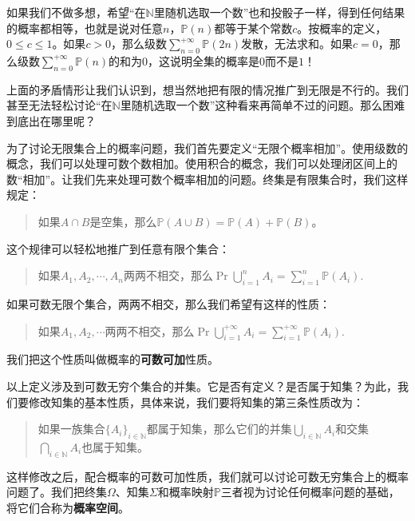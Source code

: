 \documentclass[12pt,UTF8]{ctexbook}
\begin{document}
如果我们不做多想，希望“在$\mathbb{N}$里随机选取一个数”也和投骰子一样，得到任何结果的概率都相等，也就是说对任意$n$，$\mathbb{P}(n)$都等于某个常数$c$。按概率的定义，$0\leqslant c\leqslant 1$。如果$c>0$，那么级数$\sum_{n=0}^{+\infty} \mathbb{P}(2n)$发散，无法求和。如果$c=0$，那么级数$\sum_{n=0}^{+\infty} \mathbb{P}(n)$的和为$0$，这说明全集的概率是$0$而不是$1$！

上面的矛盾情形让我们认识到，想当然地把有限的情况推广到无限是不行的。我们甚至无法轻松讨论“在$\mathbb{N}$里随机选取一个数”这种看来再简单不过的问题。那么困难到底出在哪里呢？

为了讨论无限集合上的概率问题，我们首先要定义“无限个概率相加”。使用级数的概念，我们可以处理可数个数相加。使用积合的概念，我们可以处理闭区间上的数“相加”。让我们先来处理可数个概率相加的问题。终集是有限集合时，我们这样规定：
\begin{quotation}
    如果$A\cap B$是空集，那么$\mathbb{P}(A\cup B) = \mathbb{P}(A) + \mathbb{P}(B)$。
\end{quotation}
这个规律可以轻松地推广到任意有限个集合：
\begin{quotation}
    \noindent 如果$A_1,A_2, \cdots, A_n$两两不相交，那么$\displaystyle\Pr{\bigcup_{i=1}^n A_i} = \sum_{i=1}^n \mathbb{P}(A_i).$
\end{quotation}
如果可数无限个集合，两两不相交，那么我们希望有这样的性质：
\begin{quotation}
    \noindent 如果$A_1,A_2, \cdots$两两不相交，那么$\displaystyle\Pr{\bigcup_{i=1}^{+\infty} A_i} = \sum_{i=1}^{+\infty} \mathbb{P}(A_i).$
\end{quotation}
我们把这个性质叫做概率的\textbf{可数可加}性质。

以上定义涉及到可数无穷个集合的并集。它是否有定义？是否属于知集？为此，我们要修改知集的基本性质，具体来说，我们要将知集的第三条性质改为：
\begin{quotation}
    \noindent 如果一族集合$\{A_i\}_{i\in\mathbb{N}}$都属于知集，那么它们的并集$\bigcup_{i\in\mathbb{N}} A_i$和交集$\bigcap_{i\in\mathbb{N}} A_i$也属于知集。
\end{quotation}
这样修改之后，配合概率的可数可加性质，我们就可以讨论可数无穷集合上的概率问题了。我们把终集$\Omega$、知集$\Sigma$和概率映射$\mathbb{P}$三者视为讨论任何概率问题的基础，将它们合称为\textbf{概率空间}。
\end{document}

